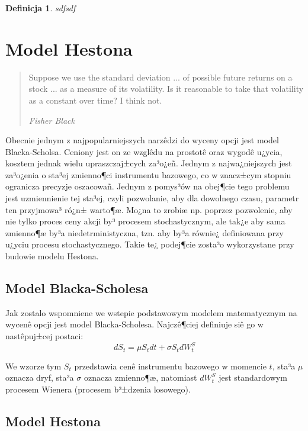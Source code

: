\documentclass{pracamgr}
\newtheorem{defi}{Definicja}[section]
\begin{document}
\begin{defi}\label{aaa}
sdfsdf
\end{defi}





\chapter{Model Hestona}
\begin{quote}
  Suppose we use the standard deviation ... of possible future returns on
  a stock ... as a measure of its volatility. Is it reasonable to take
  that volatility as a constant over time? I think not.

\raggedleft\slshape Fisher Black 
\end{quote}

Obecnie jednym z najpopularniejszych narzêdzi do wyceny opcji jest model Blacka-Scholsa. Ceniony jest on ze wzglêdu na prostotê oraz wygodê u¿ycia, kosztem jednak wielu upraszczaj±cych za³o¿eñ. Jednym z najwa¿niejszych jest za³o¿enia o sta³ej zmienno¶ci instrumentu bazowego, co w znacz±cym stopniu ogranicza precyzje oszacowañ. Jednym z pomys³ów na obej¶cie tego problemu jest uzmiennienie tej sta³ej, czyli pozwolanie, aby dla dowolnego czasu, parametr ten przyjmowa³ ró¿n± warto¶æ. Mo¿na to zrobiæ np. poprzez pozwolenie, aby nie tylko proces ceny akcji by³ procesem stochastycznym, ale tak¿e aby sama zmienno¶æ by³a niedetrministyczna, tzn. aby by³a równie¿ definiowana przy u¿yciu procesu stochastycznego. Takie te¿ podej¶cie zosta³o wykorzystane przy budowie modelu Hestona.

\section{Model Blacka-Scholesa}

Jak zostalo wspomniene we wstepie podstawowym modelem matematycznym na wycenê opcji jest model Blacka-Scholesa. Najczê¶ciej definiuje siê go w nastêpuj±cej postaci:
\begin{equation}
dS_t  = \mu S_t dt + \sigma S_t dW^S_t
\end{equation}

We wzorze tym $S_t$ przedstawia cenê instrumentu bazowego w momencie $t$, sta³a $\mu$ oznacza dryf, sta³a $\sigma$ oznacza zmienno¶æ, natomiast $dW^S_t$ jest standardowym procesem Wienera (procesem b³±dzenia losowego).


 

\section{Model Hestona}
\end{document}
